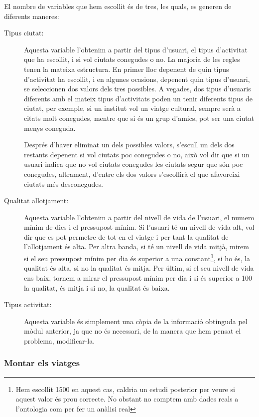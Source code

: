 \documentclass[11pt,a4paper]{article}
\begin{document}
El nombre de variables que hem escollit és de tres, les quals, es generen de diferents maneres:

\begin{description}
\item[Tipus ciutat:]Aquesta variable l'obtenim a partir del tipus d'usuari, el tipus d'activitat que ha escollit, i si vol ciutats conegudes o no. La majoria de les regles tenen la mateixa estructura. En primer lloc depenent de quin tipus d'activitat ha escollit, i en algunes ocasions, depenent quin tipus d'usuari, se seleccionen dos valors dels tres possibles. A vegades, dos tipus d'usuaris diferents amb el mateix tipus d'activitats poden un tenir diferents tipus de ciutat, per exemple, si un institut vol un viatge cultural, sempre serà a citats molt conegudes, mentre que si és un grup d'amics, pot ser una ciutat menys coneguda.

Després d'haver eliminat un dels possibles valors, s'escull un dels dos restants depenent si vol ciutats poc conegudes o no, això vol dir que si un usuari indica que no vol ciutats conegudes les ciutats segur que són poc conegudes, altrament, d'entre els dos valors s'escollirà el que afavoreixi ciutats més desconegudes.

\item[Qualitat allotjament:]Aquesta variable l'obtenim a partir del nivell de vida de l'usuari, el numero mínim de dies i el pressupost mínim. Si l'usuari té un nivell de vida alt, vol dir que es pot permetre de tot en el viatge i per tant la qualitat de l'allotjament és alta. Per altra banda, si té un nivell de vida mitjà, mirem si el seu pressupost mínim per dia és superior a una constant\footnote{Hem escollit 1500 en aquest cas, caldria un estudi posterior per veure si aquest valor és prou correcte. No obstant no comptem amb dades reals a l'ontologia com per fer un anàlisi real}, si ho és, la qualitat és alta, si no la qualitat és mitja. Per últim, si el seu nivell de vida ens baix, tornem a mirar el pressupost mínim per dia i si és superior a 100 la qualitat, és mitja i si no, la qualitat és baixa.

\item[Tipus activitat:] Aquesta variable és simplement una còpia de la informació obtinguda pel mòdul anterior, ja que no és necessari, de la manera que hem pensat el problema, modificar-la.
\end{description}


\subsubsection*{Montar els viatges}
\end{document}
